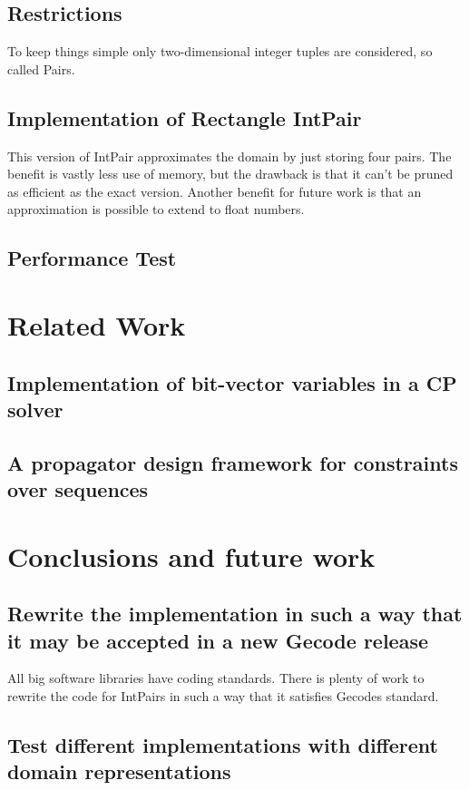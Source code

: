 \documentclass[a4paper,11pt]{article}
\begin{document}
\subsection{Restrictions}
To keep things simple only two-dimensional integer tuples are considered, so called Pairs.

\subsection{Implementation of Rectangle IntPair}
This version of IntPair approximates the domain by just storing four pairs. The benefit is vastly less use of memory, but the drawback is that it can't be pruned as efficient as the exact version. Another benefit for future work is that an approximation is possible to extend to float numbers.

\subsection{Performance Test}

\section{Related Work}
\subsection{Implementation of bit-vector variables in a CP solver}
\subsection{A propagator design framework for constraints over sequences}

\section{Conclusions and future work}

\subsection{Rewrite the implementation in such a way that it may be accepted in a new Gecode release}
All big software libraries have coding standards. There is plenty of work to rewrite the code for IntPairs in such a way that it satisfies Gecodes standard.
\subsection{Test different implementations with different domain representations}
\end{document}
